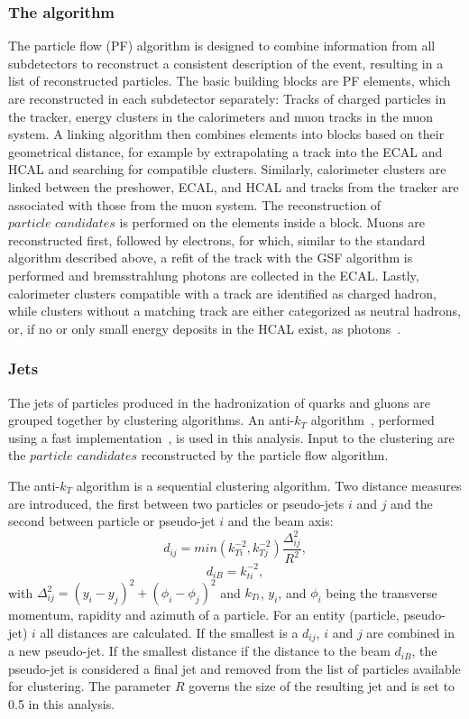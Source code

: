 \subsubsection{The algorithm}
The particle flow (PF) algorithm is designed to combine information from all subdetectors to reconstruct a consistent description of the event, resulting in a list of reconstructed particles. The basic building blocks are PF elements, which are reconstructed in each subdetector separately: Tracks of charged particles in the tracker, energy clusters in the calorimeters and muon tracks in the muon system. A linking algorithm then combines elements into blocks based on their geometrical distance, for example by extrapolating a track into the ECAL and HCAL and searching for compatible clusters. Similarly, calorimeter clusters are linked between the preshower, ECAL, and HCAL and tracks from the tracker are associated with those from the muon system. The reconstruction of $\textit{particle candidates}$ is performed on the elements inside a block. Muons are reconstructed first, followed by electrons, for which, similar to the standard algorithm described above, a refit of the track with the GSF algorithm is performed and bremsstrahlung photons are collected in the ECAL. Lastly, calorimeter clusters compatible with a track are identified as charged hadron, while clusters without a matching track are either categorized as neutral hadrons, or, if no or only small energy deposits in the HCAL exist, as photons~\cite{CMS-PAS-PFT-09-001}. 
\subsubsection{Jets}
The jets of particles produced in the hadronization of quarks and gluons are grouped together by clustering algorithms. An anti-$k_T$ algorithm~\cite{Cacciari:2008gp}, performed using a fast implementation~\cite{Cacciari:2011ma,Cacciari:2005hq}, is used in this analysis.  Input to the clustering are the $\textit{particle candidates}$ reconstructed by the particle flow algorithm.

The anti-$k_T$ algorithm is a sequential clustering algorithm. Two distance measures are introduced, the first between two particles or pseudo-jets $i$ and $j$ and the second between particle or pseudo-jet $i$ and the beam axis: 
\begin{equation}
d_{ij} = min(k_{Ti}^{-2},k_{Tj}^{-2})\frac{\Delta^2_{ij}}{R^2},
\end{equation}
\begin{equation}
d_{iB} = k_{ti}^{-2},
\end{equation}
with $\Delta_{ij}^2 = (y_i-y_j)^2 + (\phi_i - \phi_j)^2$ and $k_{Ti}$, $y_i$, and $\phi_i$ being the transverse momentum, rapidity and azimuth of a particle. For an entity (particle, pseudo-jet) $i$ all distances are calculated. If the smallest is a $d_{ij}$, $i$ and $j$ are combined in a new pseudo-jet. If the smallest distance if the distance to the beam $d_{iB}$, the pseudo-jet is considered a final jet and removed from the list of particles available for clustering. The parameter $R$ governs the size of the resulting jet and is set to 0.5 in this analysis. 

